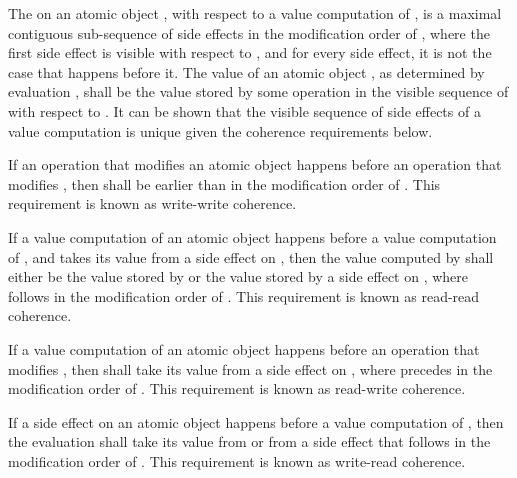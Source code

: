 \pnum
The 
on an atomic object , with
respect to a
%
value computation  of , is a maximal contiguous
sub-sequence of
%
side effects in the modification order of , where the
first
%
side effect is visible with respect to , and for every side
effect, it is not the case that  happens before it. The value of an
atomic object , as determined by evaluation , shall be the value
stored by some operation in the visible sequence of  with respect to
. \enternote It can be shown that the visible sequence of
%
side effects
of a value computation is unique given the coherence requirements below.
\exitnote

\pnum
If an operation  that modifies an atomic object  happens before
an operation  that modifies , then  shall be earlier
than  in the modification order of . \enternote This requirement
is known as write-write coherence. \exitnote

\pnum
If a
%
value computation  of an atomic object  happens before a
value computation  of , and  takes its value from a side
effect  on , then the value computed by  shall either be
the value stored by  or the value stored by a
%
side effect  on
, where  follows  in the modification order of .
\enternote This requirement is known as read-read coherence. \exitnote

\pnum
If a
%
value computation  of an atomic object  happens before an
operation  that modifies , then  shall take its value from a side
effect  on , where  precedes  in the
modification order of . \enternote This requirement is known as
read-write coherence. \exitnote

\pnum
If a
%
side effect  on an atomic object  happens before a value
computation  of , then the evaluation  shall take its
value from  or from a
%
side effect  that follows  in the
modification order of . \enternote This requirement is known as
write-read coherence. \exitnote

